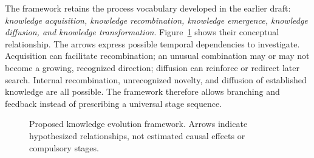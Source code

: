 The framework retains the process vocabulary developed in the earlier draft:
\emph{knowledge acquisition, knowledge recombination, knowledge emergence,
knowledge diffusion, and knowledge transformation}. Figure~\ref{fig:framework}
shows their conceptual relationship. The arrows express possible temporal
dependencies to investigate. Acquisition can facilitate recombination; an unusual
combination may or may not become a growing, recognized direction; diffusion can
reinforce or redirect later search. Internal recombination, unrecognized novelty,
and diffusion of established knowledge are all possible. The framework therefore
allows branching and feedback instead of prescribing a universal stage sequence.

\begin{figure}[tbp]
\centering
{}
\caption{Proposed knowledge evolution framework. Arrows indicate hypothesized relationships, not estimated causal effects or compulsory stages.}
\label{fig:framework}
\end{figure}


